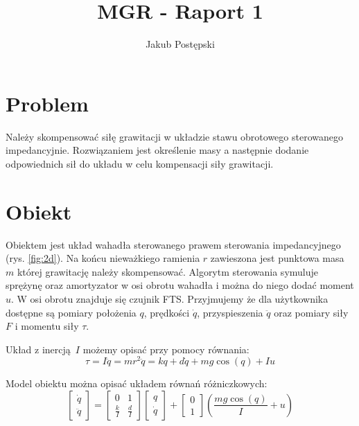 \documentclass[a4paper, 10pt]{article}
\title{MGR - Raport 1}
\author{Jakub Postępski}
\begin{document}
\maketitle

\section{Problem}
Należy skompensować siłę grawitacji w układzie stawu obrotowego sterowanego impedancyjnie. Rozwiązaniem jest określenie masy a następnie dodanie odpowiednich sił do układu w celu kompensacji siły grawitacji.

\section{Obiekt}
Obiektem jest układ wahadła sterowanego prawem sterowania impedancyjnego (rys. \ref{fig:2d}). Na końcu nieważkiego ramienia $r$ zawieszona jest punktowa masa $m$ której grawitację należy skompensować. Algorytm sterowania symuluje sprężynę oraz amortyzator w osi obrotu wahadła i można do niego dodać moment $u$. W osi obrotu znajduje się czujnik FTS. Przyjmujemy że dla użytkownika dostępne są pomiary położenia $q$, prędkości $\dot{q}$, przyspieszenia $\ddot{q}$ oraz pomiary siły $F$ i momentu siły $\tau$.

Układ z inercją $I$ możemy opisać przy pomocy równania:
\begin{equation}
\label{eq:intro}
\tau = I\ddot{q} = mr^2\ddot{q} = kq + d\dot{q} + mg\cos{(q)} + Iu
\end{equation}

Model obiektu można opisać układem równań różniczkowych:
\begin{equation}
	\begin{bmatrix}
	    \dot{q} \\
	    \ddot{q}
	\end{bmatrix}
	=
	\begin{bmatrix}
	    0 & 1 \\
	    \frac{k}{I} & \frac{d}{I}
	\end{bmatrix}
	\begin{bmatrix}
		q \\
	    \dot{q}
	\end{bmatrix}
	+
	\begin{bmatrix}
	    0 \\
	    1
	\end{bmatrix}
	(\frac{mg\cos{(q)}}{I} + u)
\end{equation}
\end{document}
